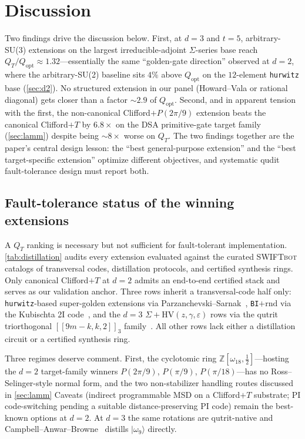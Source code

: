 \documentclass[twocolumn,superscriptaddress,showpacs,nofootinbib,notitlepage,preprintnumbers,secnumarabic,amssymb, nobibnotes, aps, prd]{revtex4-2}
\newcommand{\QT}{Q_{T}}              %
\newcommand{\Popt}{Q_{\mathrm{opt}}} %
\newcommand{\HV}[3]{\mathrm{HV}(#1,#2,#3)} %
\newcommand{\SWIFTbot}{\textsc{SWIFTbot}\xspace}
\begin{document}
\section{Discussion}\label{sec:discussion}

Two findings drive the discussion below. First, at $d=3$ and $t=5$, arbitrary-SU(3) extensions on the largest irreducible-adjoint $\Sigma$-series base reach $\QT/\Popt \approx 1.32$---essentially the same ``golden-gate direction'' observed at $d=2$, where the arbitrary-SU(2) baseline sits $4\%$ above $\Popt$ on the $12$-element \texttt{hurwitz} base (\cref{sec:d2}). No structured extension in our panel (Howard--Vala or rational diagonal) gets closer than a factor $\sim\!2.9$ of $\Popt$. Second, and in apparent tension with the first, the non-canonical Clifford$+P(2\pi/9)$ extension beats the canonical Clifford$+T$ by $6.8\times$ on the DSA primitive-gate target family (\cref{sec:lamm}) despite being $\sim\!8\times$ worse on $\QT$. The two findings together are the paper's central design lesson: the ``best general-purpose extension'' and the ``best target-specific extension'' optimize different objectives, and systematic qudit fault-tolerance design must report both.

\subsection{Fault-tolerance status of the winning extensions}\label{sec:discussion_ft}

A $\QT$ ranking is necessary but not sufficient for fault-tolerant implementation. \cref{tab:distillation} audits every extension evaluated against the curated \SWIFTbot catalogs of transversal codes, distillation protocols, and certified synthesis rings. Only canonical Clifford$+T$ at $d=2$ admits an end-to-end certified stack and serves as our validation anchor. Three rows inherit a transversal-code half only: \texttt{hurwitz}-based super-golden extensions via Parzanchevski--Sarnak~\cite{ParzanchevskiSarnak:2018}, \texttt{BI}$+\mathrm{rnd}$ via the Kubischta 2I code~\cite{Kubischta:2I}, and the $d=3$ $\Sigma+\HV{z}{\gamma}{\varepsilon}$ rows via the qutrit triorthogonal $[[9m-k,k,2]]_3$ family~\cite{Campbell:2012jna}. All other rows lack either a distillation circuit or a certified synthesis ring.

Three regimes deserve comment. First, the cyclotomic ring $\mathbb{Z}[\omega_{18},\tfrac{1}{2}]$---hosting the $d=2$ target-family winners $P(2\pi/9)$, $P(\pi/9)$, $P(\pi/18)$---has no Ross--Selinger-style normal form, and the two non-stabilizer handling routes discussed in \cref{sec:lamm} Caveats (indirect programmable MSD on a Clifford$+T$ substrate; PI code-switching pending a suitable distance-preserving PI code) remain the best-known options at $d=2$. At $d=3$ the same rotations are qutrit-native and Campbell--Anwar--Browne~\cite{Campbell:2012jna} distills $|\omega_9\rangle$ directly.
\end{document}
